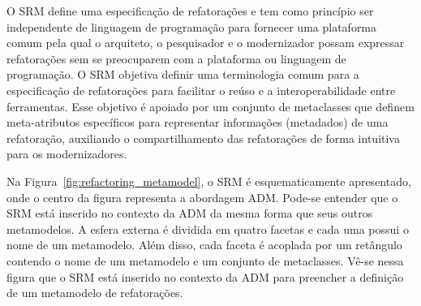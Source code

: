 O SRM define uma especificação de refatorações e tem como princípio ser independente de linguagem de programação para fornecer uma plataforma comum pela qual o arquiteto, o pesquisador e o modernizador possam expressar refatorações sem se preocuparem com a plataforma ou linguagem de programação. O SRM objetiva definir uma terminologia comum para a especificação de refatorações para facilitar o reúso e a interoperabilidade entre ferramentas. Esse objetivo é apoiado por um conjunto de metaclasses que definem meta-atributos específicos para representar informações (metadados) de uma refatoração, auxiliando o compartilhamento das refatorações de forma intuitiva para os modernizadores.

 
Na Figura~\ref{fig:refactoring_metamodel}, o SRM é esquematicamente apresentado, onde o centro da figura representa a abordagem ADM. Pode-se entender que o SRM está inserido no contexto da ADM da mesma forma que seus outros metamodelos. A esfera externa é dividida em quatro facetas e cada uma possui o nome de um metamodelo. Além disso, cada faceta é acoplada por um retângulo contendo o nome de um metamodelo e um conjunto de metaclasses. Vê-se nessa figura  que o SRM está inserido no contexto da ADM para preencher a definição de um metamodelo de refatorações. 

